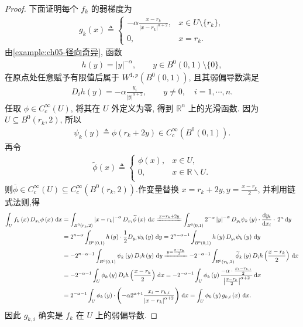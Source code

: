 \documentclass[../../main.tex]{subfiles}
\begin{document}
\begin{proof}
下面证明每个 $f_k$ 的弱梯度为
\begin{align*}
g_k(x)\triangleq
\begin{cases}
-\alpha\displaystyle\frac{x-r_k}{|x-r_k|^{\alpha+2}},
& x\in U\setminus\{r_k\},\\
0, & x=r_k.
\end{cases}
\end{align*}
由\cref{example:ch05-径向奇异}, 函数
\begin{align*}
h(y)=|y|^{-\alpha},
\qquad y\in B^{0}(0,1)\setminus\{0\},
\end{align*}
在原点处任意赋予有限值后属于 $W^{1,p}(B^{0}(0,1))$, 且其弱偏导数满足
\begin{align*}
D_i h(y)=-\alpha\frac{y_i}{|y|^{\alpha+2}},
\qquad y\neq0,\quad i=1,\cdots,n.
\end{align*}
任取 $\phi\in C_c^\infty(U)$, 将其在 $U$ 外定义为零, 得到 $\mathbb{R}^n$ 上的光滑函数. 因为 $U\subseteq B^{0}(r_k,2)$, 所以
\begin{align*}
\psi_k(y)\triangleq\phi(r_k+2y)\in C_c^\infty(B^{0}(0,1)).
\end{align*}
再令
\begin{align*}
\widetilde{\phi }\left( x \right) \triangleq \begin{cases}
\phi \left( x \right) ,&x\in U,\\
0,&x\in \mathbb{R} \backslash U.\\
\end{cases}
\end{align*}
则$\overline{\phi}\in C_c^\infty(U)\subseteq C_c^\infty(B^0(r_k,2))$.作变量替换 $x=r_k+2y,y=\frac{x-r_k}{2}$, 并利用链式法则,得
\begin{align*}
\int_U{f_k\left( x \right) D_{x_i}\phi \left( x \right) \,\mathrm{d}x}&=\int_{B^0(r_k,2)}{\left| x-r_k \right|^{-\alpha}D_{x_i}\widetilde{\phi }\left( x \right) \,\mathrm{d}x}\xlongequal{x=r_k+2y}\int_{B^0(0,1)}{2^{-\alpha}\left| y \right|^{-\alpha}D_{y_i}\psi _k\left( y \right) \cdot \frac{\mathrm{d}y_i}{\mathrm{d}x_i}\cdot \,2^n\,\mathrm{d}y}
\\
&=2^{n-\alpha}\int_{B^0(0,1)}{h\left( y \right) \cdot \frac{1}{2}D_{y_i}\psi _k\left( y \right) \,\mathrm{d}y}=2^{n-\alpha -1}\int_{B^0(0,1)}{h\left( y \right) D_{y_i}\psi _k\left( y \right) \,\mathrm{d}y}
\\
&=-2^{n-\alpha -1}\int_{B^0(0,1)}{\psi _k\left( y \right) D_ih\left( y \right) \,\mathrm{d}y}\xlongequal{y=\frac{x-r_k}{2}}-2^{-\alpha -1}\int_{B^0(r_k,2)}{\widetilde{\phi }_k\left( y \right) D_ih\left( \frac{x-r_k}{2} \right) \,\mathrm{d}x}
\\
&=-2^{-\alpha -1}\int_U{\phi _k\left( y \right) D_ih\left( \frac{x-r_k}{2} \right) \,\mathrm{d}x}=-2^{-\alpha -1}\int_U{\phi _k\left( y \right) \frac{-\alpha \cdot \frac{x_i-r_{k,i}}{2}}{\left| \frac{x-r_k}{2} \right|^{\alpha +2}}\,\mathrm{d}x}
\\
&=2^{-\alpha -1}\int_U{\phi _k\left( y \right) \cdot \left( -\alpha 2^{\alpha +1}\frac{x_i-r_{k,i}}{\left| x-r_k \right|^{\alpha +2}} \right) \,\mathrm{d}x}=\int_U{\phi _k\left( y \right) g_{k,i}\left( x \right) \,\mathrm{d}x}.
\end{align*}
因此 $g_{k,i}$ 确实是 $f_k$ 在 $U$ 上的弱偏导数.


\end{proof}
\end{document}
